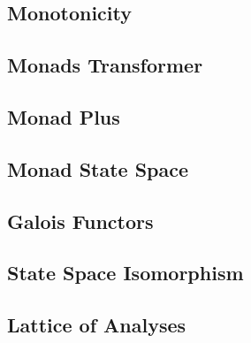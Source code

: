 \subsection{Monotonicity}

\subsection{Monads Transformer}

\subsection{Monad Plus}

\subsection{Monad State Space}

\subsection{Galois Functors}

\subsection{State Space Isomorphism}

\subsection{Lattice of Analyses}
